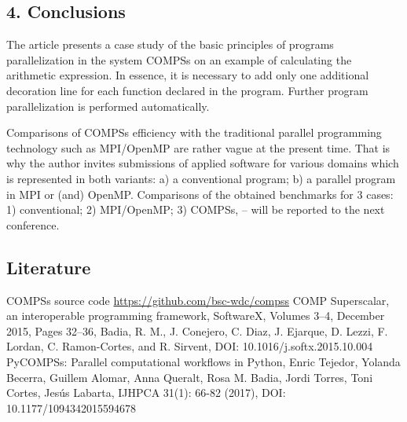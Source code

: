 \documentclass[10pt, a5paper]{article}
\begin{document}
\subsection*{4. Conclusions}

The article presents a case study of the basic principles of programs parallelization in the system COMPSs on an example of calculating the arithmetic expression. In essence, it is necessary to add only one additional decoration line for each function declared in the program. Further program parallelization is performed automatically.

Comparisons of COMPSs efficiency with the traditional parallel programming technology such as MPI/OpenMP are rather vague at the present time. That is why the author invites submissions of applied software for various domains which is represented in both variants: a) a conventional program; b) a parallel program in MPI or (and) OpenMP. Comparisons of the obtained benchmarks for 3 cases: 1) conventional; 2) MPI/OpenMP; 3) COMPSs, -- will be reported to the next conference.

\subsection*{Literature}

\begin{thebibliography}{9}
 {COMPSs source code \url{https://github.com/bsc-wdc/compss}}
 {COMP Superscalar, an interoperable programming framework, SoftwareX, Volumes 3–4, December 2015, Pages 32–36, Badia, R. M., J. Conejero, C. Diaz, J. Ejarque, D. Lezzi, F. Lordan, C. Ramon-Cortes, and R. Sirvent, DOI: 10.1016/j.softx.2015.10.004}
 {PyCOMPSs: Parallel computational workflows in Python, Enric Tejedor, Yolanda Becerra, Guillem Alomar, Anna Queralt, Rosa M. Badia, Jordi Torres, Toni Cortes, Jesús Labarta,  IJHPCA 31(1): 66-82 (2017), DOI: 10.1177/1094342015594678}\end{thebibliography}
\end{document}
